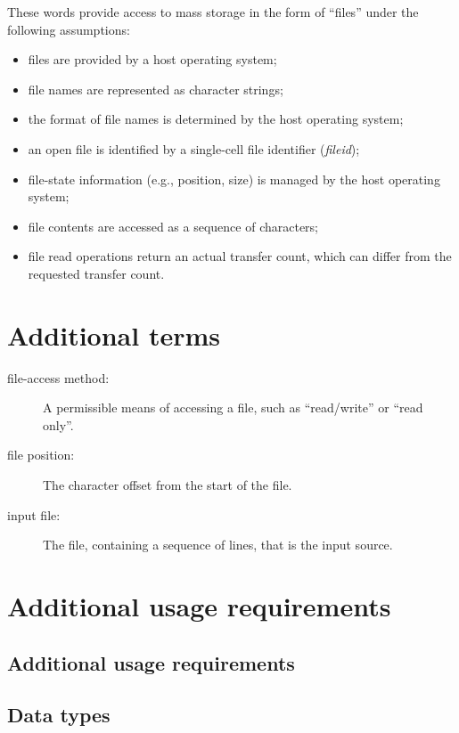 These words provide access to mass storage in the form of ``files''
under the following assumptions:

\begin{itemize}
\item files are provided by a host operating system;
\item file names are represented as character strings;
\item the format of file names is determined by the host operating
	system;
\item an open file is identified by a single-cell file identifier
	(\emph{fileid});
\item file-state information (e.g., position, size) is managed by
	the host operating system;
\item file contents are accessed as a sequence of characters;
\item file read operations return an actual transfer count, which
	can differ from the requested transfer count.
\end{itemize}

\section{Additional terms} %

\begin{description}
\item[file-access method:]
	A permissible means of accessing a file, such as ``read/write''
	or ``read only''.

\item[file position:]
	The character offset from the start of the file.

\item[input file:]
	The file, containing a sequence of lines, that is the input source.
\end{description}

\section{Additional usage requirements} %

\begin{info}
\subsection{Additional usage requirements}
\end{info}

\subsection{Data types} %

